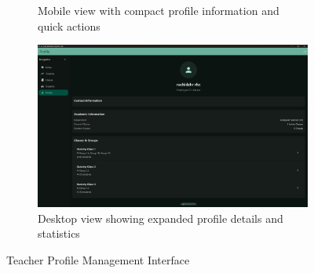 \begin{figure}[H]
\begin{subfigure}[b]{0.48\textwidth}
        \caption{Mobile view with compact profile information and quick actions}
    \end{subfigure}
    \hfill
    \begin{subfigure}[b]{0.48\textwidth}
        \includegraphics[width=\textwidth]{images/rachid/teacher-side-profile-disktop.png}
        \caption{Desktop view showing expanded profile details and statistics}
    \end{subfigure}
    \caption{Teacher Profile Management Interface}
    \label{fig:profile-interface}
\end{figure}

